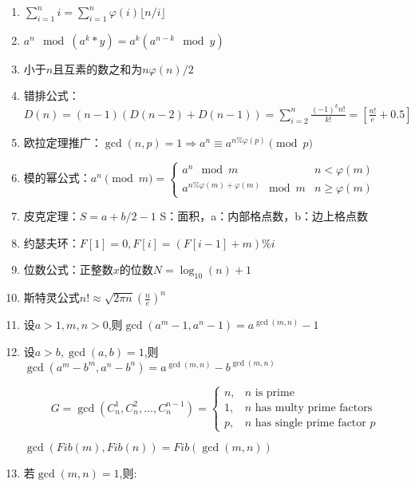 \begin{enumerate}

\item $\sum_{i=1}^n i=\sum_{i=1}^n\varphi(i)\lfloor n/i\rfloor$

\item $a^n\mod(a^k*y)=a^k(a^{n-k}\mod y)$

\item 小于$n$且互素的数之和为$n\varphi(n)/2$

\item 错排公式：$D(n)=(n-1)(D(n-2)+D(n-1))=\sum_{i=2}^n\frac{(-1)^kn!}{k!}=[\frac{n!}{e}+0.5]$

\item 欧拉定理推广：$\gcd(n,p)=1\Rightarrow a^n\equiv a^{n\%\varphi(p)}\pmod p$

\item 模的幂公式：$a ^ n \pmod {m} = 
\begin{cases}
a ^ n \mod m & n < \varphi(m)\\
a ^ {n \% \varphi(m) + \varphi(m)} \mod m & n \ge \varphi(m)
\end{cases}
$

\item 皮克定理：$S=a+b/2-1$ S：面积，a：内部格点数，b：边上格点数

\item 约瑟夫环：$F[1]=0,F[i]=(F[i-1]+m)\% i$

\item 位数公式：正整数$x$的位数$N=\log_{10}(n)+1$

\item 斯特灵公式$n!\approx\sqrt{2\pi n}(\frac{n}{e})^n$

\item 设$a>1,m,n>0$,则$\gcd(a^m-1,a^n-1)=a^{\gcd(m,n)}-1$

\item 设$a>b,\gcd(a,b)=1$,则$\gcd(a^m-b^m,a^n-b^n)=a^{\gcd(m,n)}-b^{\gcd(m,n)}$

$$
G=\gcd(C_n^1,C_n^2,...,C_n^{n-1})=
\begin{cases}
	n, & \text{$n$ is prime} \\
	1, & \text{$n$ has multy prime factors} \\
	p, & \text{$n$ has single prime factor $p$}
\end{cases}
$$

$\gcd(Fib(m),Fib(n))=Fib(\gcd(m,n))$

\item 若$\gcd(m,n)=1$,则:


\end{enumerate}
